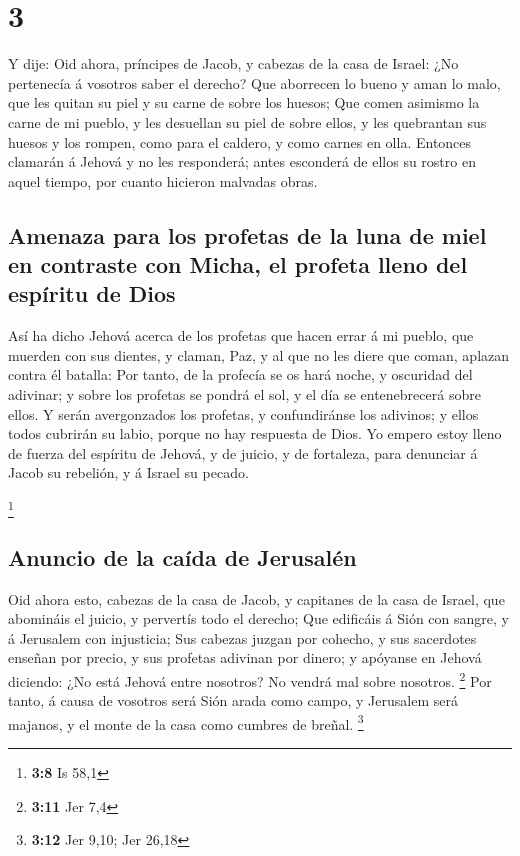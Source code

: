 \hypertarget{section-2}{%
\section{3}\label{section-2}}

 Y dije: Oid ahora, príncipes de Jacob, y cabezas de la casa
de Israel: ¿No pertenecía á vosotros saber el derecho?  Que
aborrecen lo bueno y aman lo malo, que les quitan su piel y su carne de
sobre los huesos;  Que comen asimismo la carne de mi pueblo,
y les desuellan su piel de sobre ellos, y les quebrantan sus huesos y
los rompen, como para el caldero, y como carnes en olla. 
Entonces clamarán á Jehová y no les responderá; antes esconderá de ellos
su rostro en aquel tiempo, por cuanto hicieron malvadas obras.

\hypertarget{amenaza-para-los-profetas-de-la-luna-de-miel-en-contraste-con-micha-el-profeta-lleno-del-espuxedritu-de-dios}{%
\subsection{Amenaza para los profetas de la luna de miel en contraste
con Micha, el profeta lleno del espíritu de
Dios}\label{amenaza-para-los-profetas-de-la-luna-de-miel-en-contraste-con-micha-el-profeta-lleno-del-espuxedritu-de-dios}}

 Así ha dicho Jehová acerca de los profetas que hacen errar
á mi pueblo, que muerden con sus dientes, y claman, Paz, y al que no les
diere que coman, aplazan contra él batalla:  Por tanto, de
la profecía se os hará noche, y oscuridad del adivinar; y sobre los
profetas se pondrá el sol, y el día se entenebrecerá sobre ellos.
 Y serán avergonzados los profetas, y confundiránse los
adivinos; y ellos todos cubrirán su labio, porque no hay respuesta de
Dios.  Yo empero estoy lleno de fuerza del espíritu de
Jehová, y de juicio, y de fortaleza, para denunciar á Jacob su rebelión,
y á Israel su pecado.

\footnote{\textbf{3:8} Is 58,1}

\hypertarget{anuncio-de-la-cauxedda-de-jerusaluxe9n}{%
\subsection{Anuncio de la caída de
Jerusalén}\label{anuncio-de-la-cauxedda-de-jerusaluxe9n}}

 Oid ahora esto, cabezas de la casa de Jacob, y capitanes de
la casa de Israel, que abomináis el juicio, y pervertís todo el derecho;
 Que edificáis á Sión con sangre, y á Jerusalem con
injusticia;  Sus cabezas juzgan por cohecho, y sus
sacerdotes enseñan por precio, y sus profetas adivinan por dinero; y
apóyanse en Jehová diciendo: ¿No está Jehová entre nosotros? No vendrá
mal sobre nosotros. \footnote{\textbf{3:11} Jer 7,4}  Por
tanto, á causa de vosotros será Sión arada como campo, y Jerusalem será
majanos, y el monte de la casa como cumbres de breñal. \footnote{\textbf{3:12}
  Jer 9,10; Jer 26,18}

